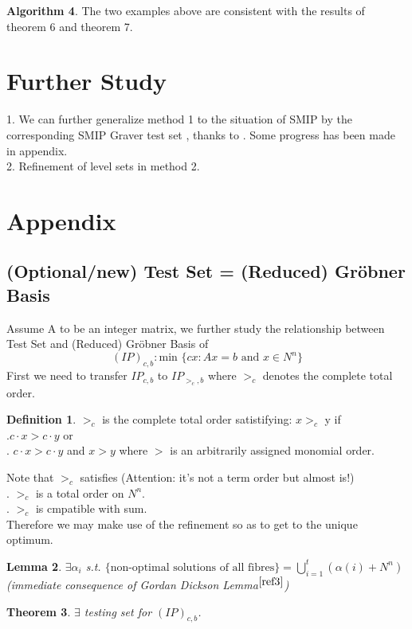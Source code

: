 \documentclass{article}
\theoremstyle{plain}
\newtheorem{theorem}{Theorem}[section]
\newtheorem{lemma}[theorem]{Lemma}
\theoremstyle{definition}
\newtheorem{definition}[theorem]{Definition}
\newtheorem{algorithm}[theorem]{Algorithm}
\begin{document}
\begin{algorithm}
The two examples above are consistent with the results of  theorem 6 and theorem 7.

\section{Further Study}
1. We can further generalize method 1 to the situation of  SMIP by the corresponding SMIP Graver test set , thanks to \cite{ref1}. Some progress has been made in appendix.\\
2. Refinement of level sets in method 2.

\section{Appendix}
\subsection{(Optional/new) Test Set = (Reduced) Gröbner Basis}
Assume A to be an integer matrix, we further study the relationship between Test Set and (Reduced) Gröbner Basis of 
$$(IP)_{c,b}: \text{min } \{cx: Ax=b \text{ and } x\in N^{n}\}
$$
First we need to transfer $IP_{c,b}$ to $IP_{>_{c},b}$ where $>_c$ denotes the complete total order. 

\begin{definition}$>_c$ is the complete total order satistifying: $x>_c$ y  if \\
.$c\cdot x>c\cdot y$ or\\
. $c\cdot x>c\cdot y$ and $x>y$ where $>$ is an arbitrarily assigned monomial order.
\end{definition}

Note that $>_c$ satisfies (Attention: it's not a term order but almost is!)\\
. $>_c$ is a total order on $N^{n}$. \\
. $>_c$ is cmpatible with sum. \\

Therefore we may make use of the refinement so as to get to the unique optimum.

\begin{lemma} $\exists \alpha_{i}$ s.t. $\{\text{non-optimal solutions of all fibres}\}=\bigcup_{i=1}^{t}(\alpha(i)+N^{n})$  (immediate consequence of Gordan Dickson Lemma$^{\cite{ref3}}$) \end{lemma}

\begin{theorem} $\exists$ testing set for $(IP)_{c,b}$. \end{theorem}


\end{algorithm}
\end{document}
